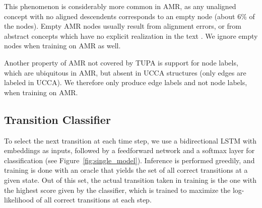 \documentclass[11pt,a4paper]{article}
\begin{document}
This phenomenon is considerably more common in AMR, as any unaligned concept
with no aligned descendents corresponds to an empty node (about 6\% of the nodes).
Empty AMR nodes usually result from alignment errors, or from abstract concepts
which have no explicit realization in the text \cite{buys2017oxford}.
We ignore empty nodes when training on AMR as well.

Another property of AMR not covered by TUPA is support for node labels, 
which are ubiquitous in AMR, but absent in UCCA structures (only edges are labeled in UCCA). 
We therefore only produce edge labels and not node labels, when training on AMR.


\subsection{Transition Classifier}\label{sec:classifier}

To select the next transition at each time step,
we use a bidirectional LSTM with embeddings as inputs,
followed by a feedforward network and a softmax layer for classification 
(see Figure~\ref{fig:single_model}).
Inference is performed greedily,
and training is done with an oracle that yields the set of all correct 
transitions at a given state.
Out of this set, the actual transition taken in training is the one
with the highest score given by the classifier,
which is trained to maximize the log-likelihood of all correct transitions at each step.
\end{document}

